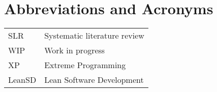 \chapter*{Abbreviations and Acronyms}


\noindent
\begin{longtable}{@{}p{}p{}@{}}
SLR & Systematic literature review\\
WIP & Work in progress\\
XP & Extreme Programming\\
LeanSD & Lean Software Development\\
\end{longtable}
